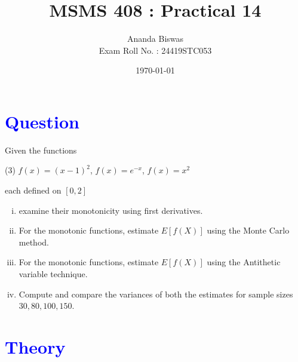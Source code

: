 \documentclass[11pt, a4paper]{article}\usepackage[]{graphicx}\usepackage[]{xcolor}
\title{MSMS 408 : Practical 14}
\author{{\fontsize{25}{20} \benyorithafont Ananda Biswas} \\[1em] Exam Roll No. : 24419STC053}
\date{\today}
\begin{document}
\maketitle


\section*{\faArrowAltCircleRight[regular] \textcolor{blue}{Question}}


\hspace{1cm} Given the functions
\begin{tasks}(3)
\task $\displaystyle{f(x) = (x - 1)^2}$,
\task $\displaystyle{f(x) = e^{-x}}$,
\task $\displaystyle{f(x) = x^2}$
\end{tasks}

each defined on $[0, 2]$


\begin{enumerate}[(i)]
\item examine their monotonicity using first derivatives.

\item For the monotonic functions, estimate $E[f(X)]$ using the Monte Carlo method.

\item For the monotonic functions, estimate $E[f(X)]$ using the Antithetic variable technique.

\item Compute and compare the variances of both the estimates for sample sizes $30, 80, 100, 150$.
\end{enumerate}

\section*{\faArrowAltCircleRight[regular] \textcolor{blue}{Theory}}
\end{document}
